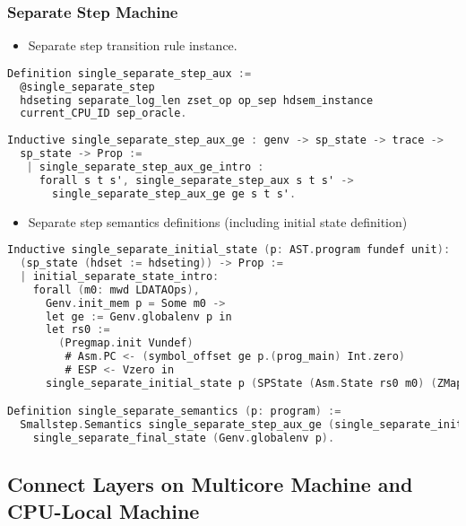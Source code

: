 \subsubsection{Separate Step Machine}
\begin{itemize}[leftmargin=*]
\item Separate step transition rule instance.
\end{itemize}
\begin{lstlisting}[language=C]
Definition single_separate_step_aux :=
  @single_separate_step
  hdseting separate_log_len zset_op op_sep hdsem_instance
  current_CPU_ID sep_oracle.
    
Inductive single_separate_step_aux_ge : genv -> sp_state -> trace -> 
  sp_state -> Prop :=
   | single_separate_step_aux_ge_intro : 
     forall s t s', single_separate_step_aux s t s' -> 
       single_separate_step_aux_ge ge s t s'.
\end{lstlisting}

\begin{itemize}[leftmargin=*]
\item Separate step semantics definitions (including initial state definition)
\end{itemize}
\begin{lstlisting}[language=C]
Inductive single_separate_initial_state (p: AST.program fundef unit): 
  (sp_state (hdset := hdseting)) -> Prop :=
  | initial_separate_state_intro: 
    forall (m0: mwd LDATAOps),
      Genv.init_mem p = Some m0 ->
      let ge := Genv.globalenv p in
      let rs0 :=
        (Pregmap.init Vundef)
         # Asm.PC <- (symbol_offset ge p.(prog_main) Int.zero)
         # ESP <- Vzero in
      single_separate_initial_state p (SPState (Asm.State rs0 m0) (ZMap.init nil)).

Definition single_separate_semantics (p: program) :=
  Smallstep.Semantics single_separate_step_aux_ge (single_separate_initial_state p) 
    single_separate_final_state (Genv.globalenv p).
\end{lstlisting}

\subsection{Connect Layers on Multicore Machine and CPU-Local Machine}
\label{chapter:certikos:subsec:connect-multicore}

